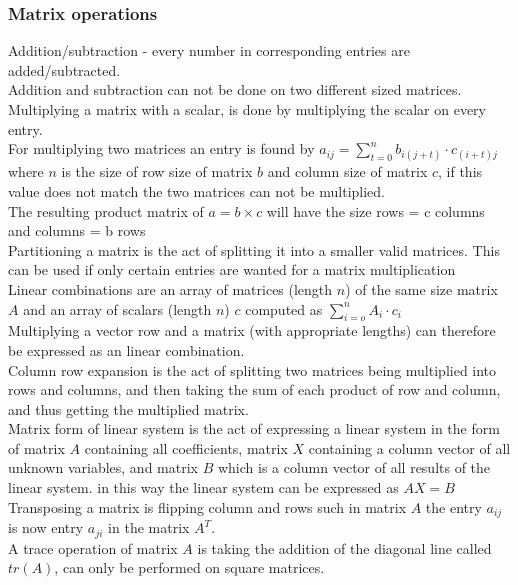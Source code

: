\documentclass[12pt, a4paper]{article}
\begin{document}
			\subsubsection{Matrix operations}
				Addition/subtraction - every number in corresponding entries are added/subtracted.\\
				Addition and subtraction can not be done on two different sized matrices.\\[4mm]
				Multiplying a matrix with a scalar, is done by multiplying the scalar on every entry.\\
				For multiplying two matrices an entry is found by $a_{ij}=\sum\limits_{t=0}^n b_{i(j+t)}\cdot c_{(i+t)j}$ where $n$ is the size of row size of matrix $b$ and column size of matrix $c$, if this value does not match the two matrices can not be multiplied.\\
				The resulting product matrix of $a = b \times c$ will have the size rows = c columns and columns = b rows\\[4mm]
				Partitioning a matrix is the act of splitting it into a smaller valid matrices. This can be used if only certain entries are wanted for a matrix multiplication\\
				Linear combinations are an array of matrices (length $n$) of the same size matrix $A$ and an array of scalars (length $n$) $c$ computed as $\sum\limits_{i=o}^n A_i\cdot c_i$\\
				Multiplying a vector row and a matrix (with appropriate lengths) can therefore be expressed as an linear combination.\\
				Column row expansion is the act of splitting two matrices being multiplied into rows and columns, and then taking the sum of each product of row and column, and thus getting the multiplied matrix.\\[4mm]
				Matrix form of linear system is the act of expressing a linear system in the form of matrix $A$ containing all coefficients, matrix $X$ containing a column vector of all unknown variables, and matrix $B$ which is a column vector of all results of the linear system. in this way the linear system can be expressed as $AX=B$\\
				Transposing a matrix is flipping column and rows such in matrix $A$ the entry $a_{ij}$ is now entry $a_{ji}$ in the matrix $A^T$.\\
				A trace operation of matrix $A$ is taking the addition of the diagonal line called $tr(A)$, can only be performed on square matrices.\\
\end{document}
